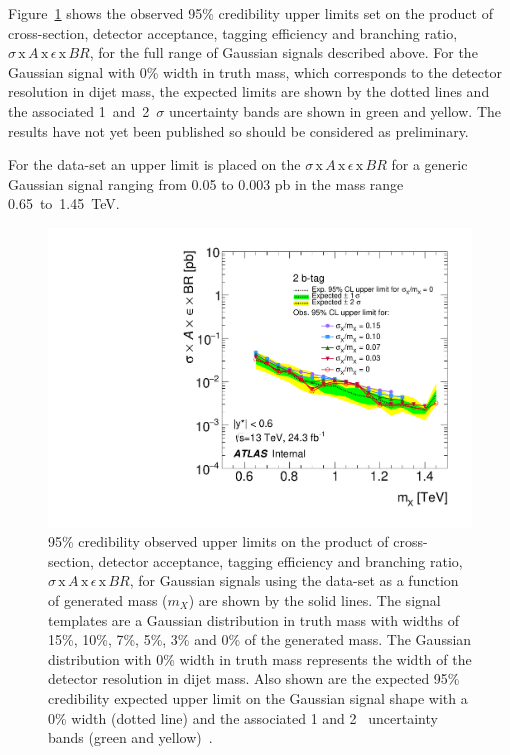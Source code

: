 Figure~\ref{fig:lim-lowmass_gauss} shows the observed 95\% credibility upper limits set 
on the product of cross-section, detector acceptance, tagging efficiency and branching ratio,
$\sigma\,\text{x}\,\mathit{A}\,\text{x}\,\epsilon\,\text{x}\,\mathit{BR}$,
for the full range of Gaussian signals described above.
For the Gaussian signal with 0\% width in truth mass, which corresponds to the detector resolution in dijet mass,
the expected limits are shown by the dotted lines and the associated 1~and~2~$\sigma$ uncertainty bands are shown in green and yellow.
The results have not yet been published so should be considered as preliminary.

For the \lm{} data-set an upper limit is placed on the $\sigma\,\text{x}\,\mathit{A}\,\text{x}\,\epsilon\,\text{x}\,\mathit{BR}$
for a generic Gaussian signal ranging from 0.05 to 0.003 pb in the mass range 0.65~to~1.45~TeV.

\begin{figure}[!ht]
  \begin{center}
    \includegraphics[width=0.9\linewidth, angle=0]{figs/Dibjet/lowmass/lim-gaussian.pdf}
  \vspace{-1.5em}
  \end{center}
  \caption[95\% credibility upper limits
    on the product of cross-section, detector acceptance, tagging efficiency and branching ratio
    for Gaussian signals using the \lm{} data-set.]
  {95\% credibility observed upper limits
    on the product of cross-section, detector acceptance, tagging efficiency and branching ratio,
    $\sigma\,\text{x}\,\mathit{A}\,\text{x}\,\epsilon\,\text{x}\,\mathit{BR}$,
    for Gaussian signals using the \lm{} data-set as a function of generated mass ($m_X$) are shown by the solid lines.
    The signal templates are a Gaussian distribution in truth mass with
    widths of 15\%, 10\%, 7\%, 5\%, 3\% and 0\% of the generated mass.
    The Gaussian distribution with 0\% width in truth mass represents the width of the detector resolution in dijet mass.
    Also shown are the expected 95\% credibility expected upper limit on the Gaussian signal shape with a 0\% width (dotted line)
    and the associated 1 and 2~\sigma{} uncertainty bands (green and yellow)~\cite{dibjet-full}.
  }
  \label{fig:lim-lowmass_gauss}
\end{figure}
